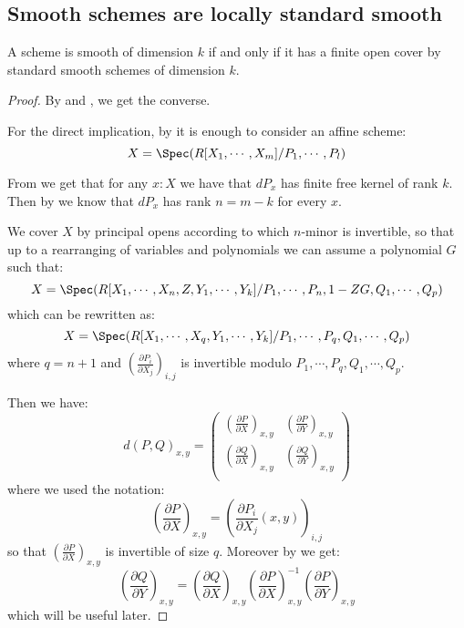 \subsection{Smooth schemes are locally standard smooth}

\begin{proposition}\label{smooth-are-locally-standard}
A scheme is smooth of dimension $k$ if and only if it has a finite open cover by standard smooth schemes of dimension $k$.
\end{proposition}

\begin{proof}
By  and , we get the converse. 

For the direct implication, by  it is enough to consider an affine scheme: 
\[
X = \Spec(R[X_1,\cdots,X_m]/P_1,\cdots,P_l)
\]

From we get that for any $x:X$ we have that $dP_x$ has finite free kernel of rank $k$. Then by  we know that $dP_x$ has rank $n=m-k$ for every $x$.

We cover $X$ by principal opens according to which $n$-minor is invertible, so that up to a rearranging of variables and polynomials we can assume a polynomial $G$ such that:
\[X = \Spec(R[X_1,\cdots,X_{n},Z,Y_1,\cdots,Y_k]/P_1,\cdots,P_{n},1-ZG,Q_1,\cdots, Q_p)\]
which can be rewritten as:
\[X = \Spec(R[X_1,\cdots,X_{q},Y_1,\cdots,Y_k]/P_1,\cdots,P_{q},Q_1,\cdots, Q_p)\]
where $q=n+1$ and $\left(\frac{\partial P_i}{\partial X_j}\right)_{i,j}$ is invertible modulo $P_1,\cdots,P_{q},Q_1,\cdots, Q_p$.

 Then we have:
\[d(P,Q)_{x,y} = \begin{pmatrix}
\left(\frac{\partial P}{\partial X}\right)_{x,y} & \left(\frac{\partial P}{\partial Y}\right)_{x,y} \\
\left(\frac{\partial Q}{\partial X}\right)_{x,y} & \left(\frac{\partial Q}{\partial Y}\right)_{x,y} \\
\end{pmatrix}\]
where we used the notation:
\[\left(\frac{\partial P}{\partial X}\right)_{x,y} = \left(\frac{\partial P_i}{\partial X_j}(x,y)\right)_{i,j}\]
so that $\left(\frac{\partial P}{\partial X}\right)_{x,y}$ is invertible of size $q$. Moreover by  we get:
\[\left(\frac{\partial Q}{\partial Y}\right)_{x,y} = \left(\frac{\partial Q}{\partial X}\right)_{x,y}\left(\frac{\partial P}{\partial X}\right)_{x,y}^{-1} \left(\frac{\partial P}{\partial Y}\right)_{x,y} \]
which will be useful later.


\end{proof}
